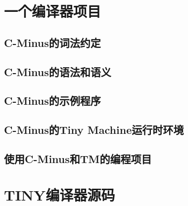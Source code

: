 \documentclass[lang=cn,10pt]{elegantbook}
\begin{document}
\appendix

\chapter{一个编译器项目}
\label{append:A}

\section{C-Minus的词法约定}

\section{C-Minus的语法和语义}

\section{C-Minus的示例程序}

\section{C-Minus的Tiny Machine运行时环境}

\section{使用C-Minus和TM的编程项目}

\chapter{TINY编译器源码}
\label{append:B}
\end{document}

